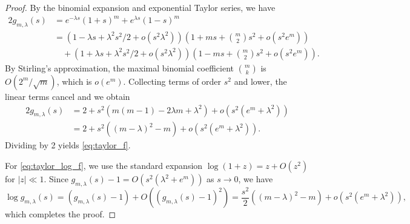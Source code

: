 \documentclass[11pt]{article}
\numberwithin{equation}{section}
\begin{document}
\begin{proof}
By the binomial expansion and exponential Taylor series, we have
\begin{align*}
    2 g_{m,\lambda}(s) &= e^{-\lambda s}(1+s)^m + e^{\lambda s}(1-s)^m\\
    &= \left(1 - \lambda s + \lambda^2 s^2/2 + o(s^2 \lambda^2)\right) \left(1 + m s + \binom{m}{2}s^2 + o(s^2 e^m)\right) \\
    &\quad + \left(1 + \lambda s + \lambda^2 s^2/2 + o(s^2 \lambda^2)\right) \left(1 - m s + \binom{m}{2}s^2 + o(s^2 e^m)\right).
\end{align*}
By Stirling's approximation, the maximal binomial coefficient $\binom{m}{k}$ is $O(2^m/\sqrt{m})$, which is $o(e^{m})$.
Collecting terms of order $s^2$ and lower, the linear terms cancel and we obtain
\begin{align*}
2 g_{m,\lambda}(s) &= 2 + s^2 \left(m(m-1) - 2\lambda m + \lambda^2 \right) + o(s^2(e^m + \lambda^2))\\
&= 2 + s^2 \left((m-\lambda)^2 - m \right) + o(s^2(e^m + \lambda^2)).
\end{align*}
Dividing by 2 yields \eqref{eq:taylor_f}.

For \eqref{eq:taylor_log_f}, we use the standard expansion $\log(1+z) = z + O(z^2)$ for $|z| \ll 1$. Since $g_{m,\lambda}(s) - 1 = O(s^2(\lambda^2 + e^m))$ as $s \to 0$, we have
\[
\log g_{m,\lambda}(s) = \left(g_{m,\lambda}(s) - 1\right) + O\!\left((g_{m,\lambda}(s)-1)^2\right) = \frac{s^2}{2}\left((m-\lambda)^2-m\right) + o(s^2(e^m + \lambda^2)),
\]
which completes the proof.
\end{proof}



\end{document}
